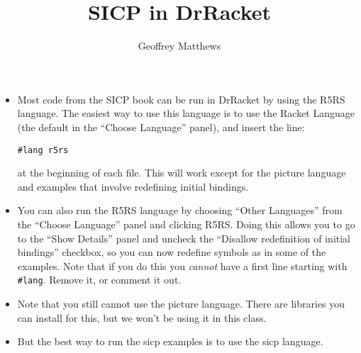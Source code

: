 \documentclass{article}
\title{SICP in DrRacket}
\author{Geoffrey Matthews}
\begin{document}
\maketitle

\begin{itemize}
\item
Most code from the SICP book can be run in DrRacket by using the R5RS
language.  The easiest way to use this language is to use the Racket
Language (the default in the ``Choose Language'' panel), and insert
the line:
\begin{verbatim}
#lang r5rs
\end{verbatim}
at the beginning of each file.  This will work except for the picture
language and examples that involve redefining initial bindings.

\item
You can also run the R5RS language by choosing ``Other Languages'' from
the ``Choose Language'' panel and clicking R5RS.  Doing this allows
you to go to the ``Show Details'' panel and uncheck the ``Disallow
redefinition of initial bindings'' checkbox, so you can now redefine
symbols as in some of the examples. Note that if you do this you
{\em cannot} have a first line starting with \verb|#lang|.  Remove it,
or comment it out.

\item Note that you still cannot use the picture language.  There
  are libraries you can install for this, but we won't be using
  it in this class.

  \item But the best way to run the sicp examples is to use the sicp language.  
\end{itemize}
\end{document}
